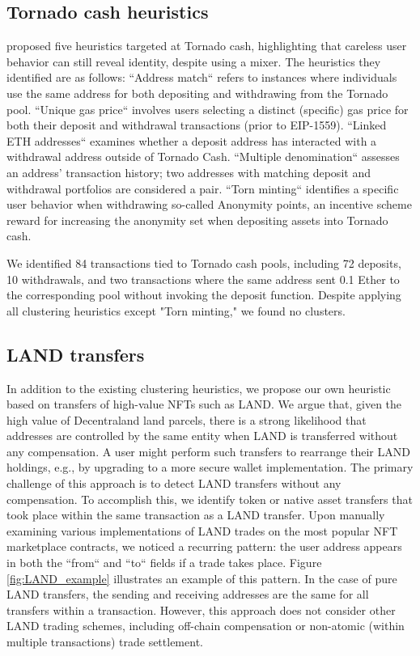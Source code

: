 \documentclass[12pt,a4paper,titlepage,oneside,english]{article}
\begin{document}
\subsection{Tornado cash heuristics}

\cite{wu2022tutela} proposed five heuristics targeted at Tornado cash, highlighting that careless user behavior can still reveal identity, despite using a mixer. The heuristics they identified are as follows: \newline
``Address match`` refers to instances where individuals use the same address for both depositing and withdrawing from the Tornado pool. ``Unique gas price`` involves users selecting a distinct (specific) gas price for both their deposit and withdrawal transactions (prior to EIP-1559). ``Linked ETH addresses`` examines whether a deposit address has interacted with a withdrawal address outside of Tornado Cash. ``Multiple denomination`` assesses an address' transaction history; two addresses with matching deposit and withdrawal portfolios are considered a pair. ``Torn minting`` identifies a specific user behavior when withdrawing so-called Anonymity points, an incentive scheme reward for increasing the anonymity set when depositing assets into Tornado cash.

We identified 84 transactions tied to Tornado cash pools, including 72 deposits, 10 withdrawals, and two transactions where the same address sent 0.1 Ether to the corresponding pool without invoking the deposit function.  Despite applying all clustering heuristics except "Torn minting," we found no clusters.

\subsection{LAND transfers}
In addition to the existing clustering heuristics, we propose our own heuristic based on transfers of high-value NFTs such as LAND. We argue that, given the high value of Decentraland land parcels, there is a strong likelihood that addresses are controlled by the same entity when LAND is transferred without any compensation. A user might perform such transfers to rearrange their LAND holdings, e.g., by upgrading to a more secure wallet implementation. \newline
The primary challenge of this approach is to detect LAND transfers without any compensation. To accomplish this, we identify token or native asset transfers that took place within the same transaction as a LAND transfer. Upon manually examining various implementations of LAND trades on the most popular NFT marketplace contracts, we noticed a recurring pattern: the user address appears in both the ``from`` and ``to`` fields if a trade takes place. Figure \ref{fig:LAND_example} illustrates an example of this pattern. 
In the case of pure LAND transfers, the sending and receiving addresses are the same for all transfers within a transaction. However, this approach does not consider other LAND trading schemes, including off-chain compensation or non-atomic (within multiple transactions) trade settlement.
\end{document}
